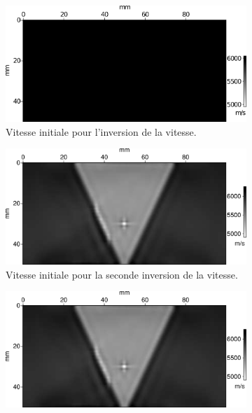


	\begin{figure}[!h]
	\begin{changemargin}{-2cm}{-2cm}
		\centering
		\begin{subfigure}[b]{0.29\textwidth}
			\includegraphics[width=\textwidth]{img/mono_param/vp_uni.png}
			\caption{Vitesse initiale pour l'inversion de la vitesse.}
		\end{subfigure}
		\begin{subfigure}[b]{0.29\textwidth}
			\includegraphics[width=\textwidth]{img/mono_param/vp_smooth.png}
			\caption{Vitesse initiale pour la seconde inversion de la vitesse.}
		\end{subfigure}
		\begin{subfigure}[b]{0.29\textwidth}
			\includegraphics[width=\textwidth]{img/mono_param/vp_smooth.png}

\end{subfigure}
\end{changemargin}
\end{figure}
